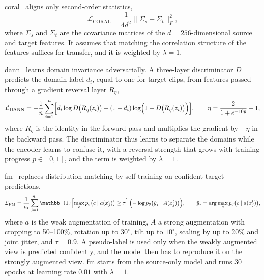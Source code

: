 \documentclass[3p,times,procedia]{elsarticle}
\begin{document}
\ac{coral}~\cite{sun2016deepcoral} aligns only second-order statistics,
\begin{equation}
  \mathcal{L}_{\mathrm{CORAL}}=\frac{1}{4d^2}\bigl\|\Sigma_s-\Sigma_t\bigr\|_F^2,
  \label{eq:coral}
\end{equation}
where $\Sigma_s$ and $\Sigma_t$ are the covariance matrices of the
$d=256$-dimensional source and target features. It assumes that matching the
correlation structure of the features suffices for transfer, and it is weighted
by $\lambda=1$.

\ac{dann}~\cite{ganin2016dann} learns domain invariance adversarially. A
three-layer discriminator $D$ predicts the domain label $d_i$, equal to one for
target clips, from features passed through a gradient reversal layer
$R_\eta$,
\begin{equation}
  \mathcal{L}_{\mathrm{DANN}}=-\frac{1}{n}\sum_{i=1}^{n}
  \Bigl[d_i\log D\bigl(R_\eta(z_i)\bigr)+(1-d_i)\log\Bigl(1-D\bigl(R_\eta(z_i)\bigr)\Bigr)\Bigr],
  \qquad\eta=\frac{2}{1+e^{-10p}}-1,
  \label{eq:dann}
\end{equation}
where $R_\eta$ is the identity in the forward pass and multiplies the gradient
by $-\eta$ in the backward pass. The discriminator thus learns to separate the
domains while the encoder learns to confuse it, with a reversal strength that
grows with training progress $p\in[0,1]$, and the term is weighted by
$\lambda=1$.

\ac{fm}~\cite{sohn2020fixmatch} replaces distribution matching by
self-training on confident target predictions,
\begin{equation}
  \mathcal{L}_{\mathrm{FM}}=\frac{1}{n_t}\sum_{j=1}^{n_t}
  \mathbb{1}\Bigl[\max_c p_\theta\bigl(c\mid a(x_j^t)\bigr)\ge\tau\Bigr]\,
  \Bigl(-\log p_\theta\bigl(\hat{y}_j\mid A(x_j^t)\bigr)\Bigr),\qquad
  \hat{y}_j=\arg\max_c p_\theta\bigl(c\mid a(x_j^t)\bigr),
  \label{eq:fm}
\end{equation}
where $a$ is the weak augmentation of training, $A$ a strong augmentation with
cropping to 50--100\%, rotation up to $30^\circ$, tilt up to $10^\circ$,
scaling by up to 20\% and joint jitter, and $\tau=0.9$. A pseudo-label is used
only when the weakly augmented view is predicted confidently, and the model
then has to reproduce it on the strongly augmented view. \ac{fm} starts from
the source-only model and runs 30 epochs at learning rate $0.01$ with
$\lambda=1$.
\end{document}
